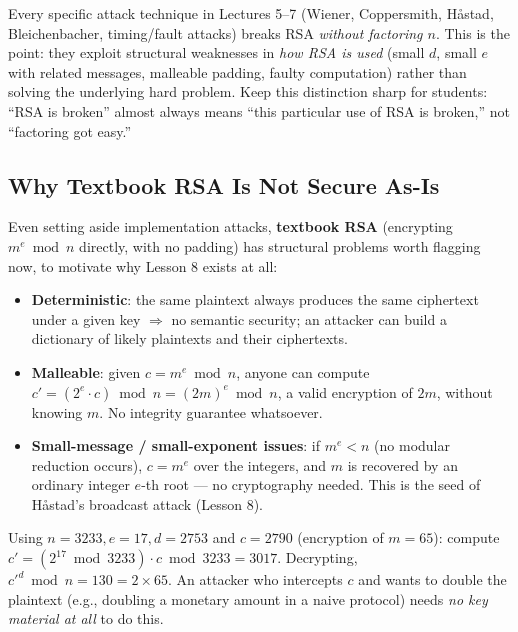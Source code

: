 \begin{remark}
Every specific attack technique in Lectures 5--7 (Wiener, Coppersmith, Håstad, Bleichenbacher, timing/fault attacks) breaks RSA \emph{without factoring $n$}. This is the point: they exploit structural weaknesses in \emph{how RSA is used} (small $d$, small $e$ with related messages, malleable padding, faulty computation) rather than solving the underlying hard problem. Keep this distinction sharp for students: ``RSA is broken'' almost always means ``this particular use of RSA is broken,'' not ``factoring got easy.''
\end{remark}

\subsection{Why Textbook RSA Is Not Secure As-Is}

Even setting aside implementation attacks, \textbf{textbook RSA} (encrypting $m^e \bmod n$ directly, with no padding) has structural problems worth flagging now, to motivate why Lesson 8 exists at all:

\begin{itemize}
\item \textbf{Deterministic}: the same plaintext always produces the same ciphertext under a given key $\Rightarrow$ no semantic security; an attacker can build a dictionary of likely plaintexts and their ciphertexts.
\item \textbf{Malleable}: given $c = m^e \bmod n$, anyone can compute $c' = (2^e \cdot c) \bmod n = (2m)^e \bmod n$, a valid encryption of $2m$, without knowing $m$. No integrity guarantee whatsoever.
\item \textbf{Small-message / small-exponent issues}: if $m^e < n$ (no modular reduction occurs), $c = m^e$ over the integers, and $m$ is recovered by an ordinary integer $e$-th root — no cryptography needed. This is the seed of Håstad's broadcast attack (Lesson 8).
\end{itemize}

\begin{example}
Using $n=3233, e=17, d=2753$ and $c = 2790$ (encryption of $m=65$): compute $c' = (2^{17} \bmod 3233) \cdot c \bmod 3233 = 3017$. Decrypting, $c'^{d} \bmod n = 130 = 2 \times 65$. An attacker who intercepts $c$ and wants to double the plaintext (e.g., doubling a monetary amount in a naive protocol) needs \emph{no key material at all} to do this.
\end{example}

